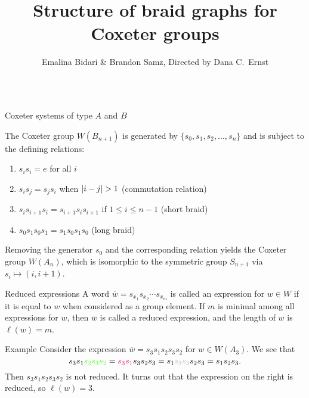 \documentclass[final]{beamer}
\title{Structure of braid graphs for Coxeter groups}
\institute{\color{summershade}Department of Mathematics \& Statistics, Northern Arizona University}
\author{Emalina Bidari \& Brandon Samz, Directed by Dana C.~Ernst}
\DeclarePairedDelimiter\abs{\lvert}{\rvert}
\newcommand{\w}{\overline{w}}
\begin{document}
\begin{frame}{}

\vspace{-1em}

\begin{columns}[T]


\begin{column}{.33\linewidth}
\begin{block}{Coxeter systems of type $A$ and $B$}

The \alert{Coxeter group $W(B_{n+1})$} is generated by $\{s_0,s_1,s_2,...,s_{n}\}$ and is subject to the defining relations:

\vspace{-0.2em}
\begin{enumerate}
\item $s_is_i = e$ for all $i$
\item $s_is_j = s_js_i$ when $\abs{i-j} > 1$ (\alert{commutation relation})
\item $s_is_{i+1}s_i = s_{i+1}s_is_{i+1}$ if $1\leq i \leq n-1$ (\alert{short braid})\\
\item $s_{0}s_{1}s_{0}s_{1}=s_{1}s_{0}s_{1}s_{0}$ (\alert{long braid})
\end{enumerate}

Removing the generator $s_0$ and the corresponding relation yields the \alert{Coxeter group $W(A_n)$}, which is isomorphic to the symmetric group $S_{n+1}$ via $s_i\mapsto (i,i+1)$. 

\end{block}


\begin{block}{Reduced expressions}
A word $\w = s_{x_1}s_{x_2}\cdots s_{x_m}$ is called an \alert{expression} for $w\in W$ if it is equal to $w$ when considered as a group element. If $m$ is minimal among all expressions for $w$, then $\w$ is called a \alert{reduced expression}, and the \alert{length} of $w$ is $\ell(w)=m$.
\end{block}


\begin{block}{Example}
Consider the expression $\w = s_3s_1s_2s_3s_2$ for $w \in W(A_3)$. We see that
\[
s_3s_1\textcolor{limegreen}{s_2s_3s_2}=\textcolor{rose}{s_3s_1}s_3s_2s_3=s_1\textcolor{monsoon}{s_3s_3}s_2s_3=s_1s_2s_3.
\]
Then $s_3s_1s_2s_3s_2$ is not reduced. It turns out that the expression on the right is reduced, so $\ell(w)=3$.
\end{block}


\end{column}
\end{columns}
\end{frame}
\end{document}
